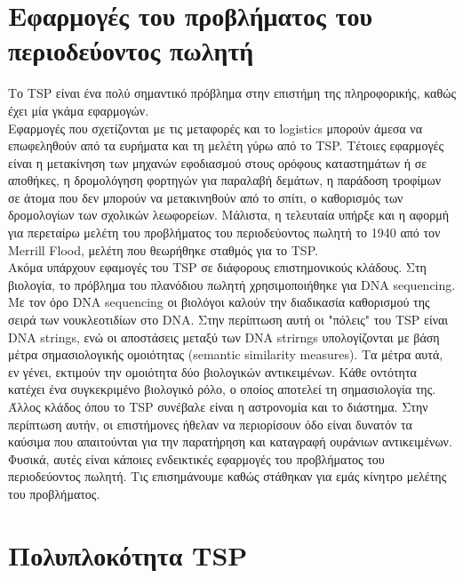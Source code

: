 \documentclass[oneside,12pt]{book}
\theoremstyle{definition}
\begin{document}
\chapter{Εφαρμογές του προβλήματος του περιοδεύοντος πωλητή}

Το TSP είναι ένα πολύ σημαντικό πρόβλημα στην επιστήμη της πληροφορικής, καθώς έχει μία γκάμα εφαρμογών. \\

Εφαρμογές που σχετίζονται με τις μεταφορές και το logistics μπορούν άμεσα να επωφεληθούν από τα ευρήματα και τη μελέτη γύρω από το TSP. Τέτοιες εφαρμογές είναι η μετακίνηση των μηχανών εφοδιασμού στους ορόφους καταστημάτων ή σε αποθήκες, η δρομολόγηση φορτηγών για παραλαβή δεμάτων, η παράδοση τροφίμων σε άτομα που δεν μπορούν να μετακινηθούν από το σπίτι, ο καθορισμός των δρομολογίων των σχολικών λεωφορείων. Μάλιστα, η τελευταία υπήρξε και η αφορμή για περεταίρω μελέτη του προβλήματος του περιοδεύοντος πωλητή το 1940 από τον Merrill Flood, μελέτη που θεωρήθηκε σταθμός για το TSP. \\

Ακόμα υπάρχουν εφαμογές του TSP σε διάφορους επιστημονικούς κλάδους. Στη βιολογία, το πρόβλημα του πλανόδιου πωλητή χρησιμοποιήθηκε για DNA sequencing. Με τον όρο DNA sequencing οι βιολόγοι καλούν την διαδικασία καθορισμού της σειρά των νουκλεοτιδίων στο DNA. Στην περίπτωση αυτή οι "πόλεις" του TSP είναι DNA strings, ενώ οι αποστάσεις μεταξύ των DNA strirngs υπολογίζονται με βάση μέτρα σημασιολογικής ομοιότητας (semantic similarity measures). Τα μέτρα αυτά, εν γένει, εκτιμούν την ομοιότητα δύο βιολογικών αντικειμένων.  Κάθε οντότητα κατέχει ένα συγκεκριμένο βιολογικό ρόλο, ο οποίος αποτελεί τη σημασιολογία της. \\

Άλλος κλάδος όπου το TSP συνέβαλε είναι η αστρονομία και το διάστημα. Στην περίπτωση αυτήν, οι επιστήμονες ήθελαν να περιορίσουν όδο είναι δυνατόν τα καύσιμα που απαιτούνται για την παρατήρηση και καταγραφή ουράνιων αντικειμένων. \\

Φυσικά, αυτές είναι κάποιες ενδεικτικές εφαρμογές του προβλήματος του περιοδεύοντος πωλητή. Τις επισημάνουμε καθώς στάθηκαν για εμάς κίνητρο μελέτης του προβλήματος. \\ 

\chapter{Πολυπλοκότητα TSP}
\end{document}
